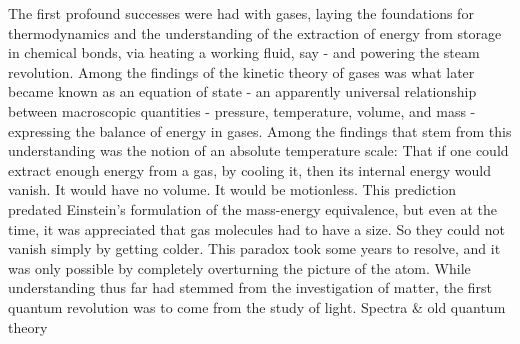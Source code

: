The first profound successes were had with gases, laying the foundations
for thermodynamics and the understanding of the extraction of energy
from storage in chemical bonds, via heating a working fluid, say - and
powering the steam revolution. Among the findings of the kinetic theory
of gases was what later became known as an equation of state - an
apparently universal relationship between macroscopic quantities -
pressure, temperature, volume, and mass - expressing the balance of
energy in gases. Among the findings that stem from this understanding
was the notion of an absolute temperature scale: That if one could
extract enough energy from a gas, by cooling it, then its internal
energy would vanish. It would have no volume. It would be motionless.
This prediction predated Einstein's formulation of the mass-energy
equivalence, but even at the time, it was appreciated that gas molecules
had to have a size. So they could not vanish simply by getting colder.
This paradox took some years to resolve, and it was only possible by
completely overturning the picture of the atom. While understanding thus
far had stemmed from the investigation of matter, the first quantum
revolution was to come from the study of light. Spectra \& old quantum
theory

